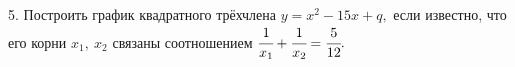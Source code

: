 5. Построить график квадратного трёхчлена $y=x^2-15x+q,$ если известно,
что его корни $x_1,\ x_2$ связаны соотношением $\cfrac{1}{x_1}+\cfrac{1}{x_2}=\cfrac{5}{12}.$\\

